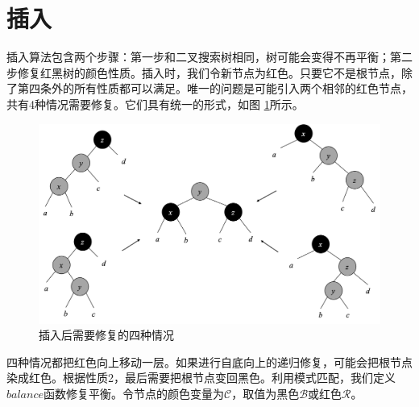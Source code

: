 \documentclass[b5paper]{ctexart}
\begin{document}
\begin{Exercise}
\end{Exercise}

\section{插入}

插入算法包含两个步骤：第一步和二叉搜索树相同，树可能会变得不再平衡；第二步修复红黑树的颜色性质。插入时，我们令新节点为红色。只要它不是根节点，除了第四条外的所有性质都可以满足。唯一的问题是可能引入两个相邻的红色节点，共有4种情况需要修复。它们具有统一的形式\cite{okasaki}，如图 \ref{fig:insert-fix}所示。

\begin{figure}[htbp]
  \centering
  \includegraphics[scale=0.4]{img/insert-fix}
  \caption{插入后需要修复的四种情况}
  \label{fig:insert-fix}
\end{figure}

四种情况都把红色向上移动一层。如果进行自底向上的递归修复，可能会把根节点染成红色。根据性质2，最后需要把根节点变回黑色。利用模式匹配，我们定义$balance$函数修复平衡。令节点的颜色变量为$\mathcal{C}$，取值为黑色$\mathcal{B}$或红色$\mathcal{R}$。
\end{document}
